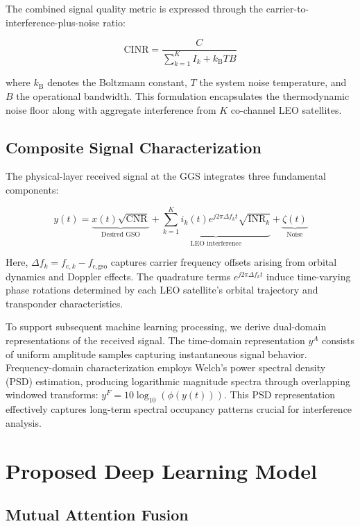 \documentclass[12pt]{article}
\begin{document}
The combined signal quality metric is expressed through the carrier-to-interference-plus-noise ratio:

\begin{equation}
    \text{CINR} = \frac{C}{\sum_{k=1}^{K}I_k + k_{\text{B}}TB}
\end{equation}

where $k_{\text{B}}$ denotes the Boltzmann constant, $T$ the system noise temperature, and $B$ the operational bandwidth. This formulation encapsulates the thermodynamic noise floor along with aggregate interference from $K$ co-channel LEO satellites.

\subsection{Composite Signal Characterization}
The physical-layer received signal at the GGS integrates three fundamental components:

\begin{equation}
    y(t) = \underbrace{x(t)\sqrt{\text{CNR}}}_{\text{Desired GSO}} + \underbrace{\sum_{k=1}^{K} i_k(t)e^{j2\pi \Delta f_k t}\sqrt{\text{INR}_k}}_{\text{LEO interference}} + \underbrace{\zeta(t)}_{\text{Noise}}
\end{equation}

Here, $\Delta f_k = f_{\text{c},k} - f_{\text{c,gso}}$ captures carrier frequency offsets arising from orbital dynamics and Doppler effects. The quadrature terms $e^{j2\pi\Delta f_k t}$ induce time-varying phase rotations determined by each LEO satellite's orbital trajectory and transponder characteristics.

To support subsequent machine learning processing, we derive dual-domain representations of the received signal. The time-domain representation $y^A$ consists of uniform amplitude samples capturing instantaneous signal behavior. Frequency-domain characterization employs Welch's power spectral density (PSD) estimation, producing logarithmic magnitude spectra through overlapping windowed transforms: $y^F = 10\log_{10}(\phi(y(t)))$. This PSD representation effectively captures long-term spectral occupancy patterns crucial for interference analysis.


\section{Proposed Deep Learning Model}

\subsection{Mutual Attention Fusion}
\label{subsec:fusion}
\end{document}
